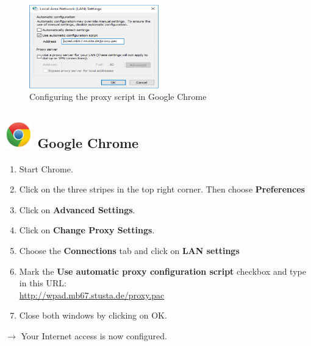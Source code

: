\documentclass[a4paper,12pt]{scrartcl}
\newcommand{\optemph}[1]{\textbf{#1}}
\begin{document}
\newpage
\begin{figure}
  \begin{center}
    \includegraphics[width=0.5\textwidth,keepaspectratio]{Bilder/Proxy_IE_EN_mb}
  \end{center}
  \caption{Configuring the proxy script in Google Chrome}
\end{figure}

\subsection*{\includegraphics[height=1.2cm,keepaspectratio]{Bilder/Chrome_2011_logo} Google Chrome}
\begin{enumerate}
    \item Start Chrome.
	\item Click on the three stripes in the top right corner. Then choose \optemph{Preferences}
	\item Click on \optemph{Advanced Settings}.
	\item Click on \optemph{Change Proxy Settings}.
	\item Choose the \optemph{Connections} tab and click on \optemph{LAN settings}
	\item Mark the \optemph{Use automatic proxy configuration script} checkbox and type in this URL: \\ \url{http://wpad.mb67.stusta.de/proxy.pac}
    \item Close both windows by clicking on OK.
\end{enumerate}
$\rightarrow$ Your Internet access is now configured.
\end{document}
